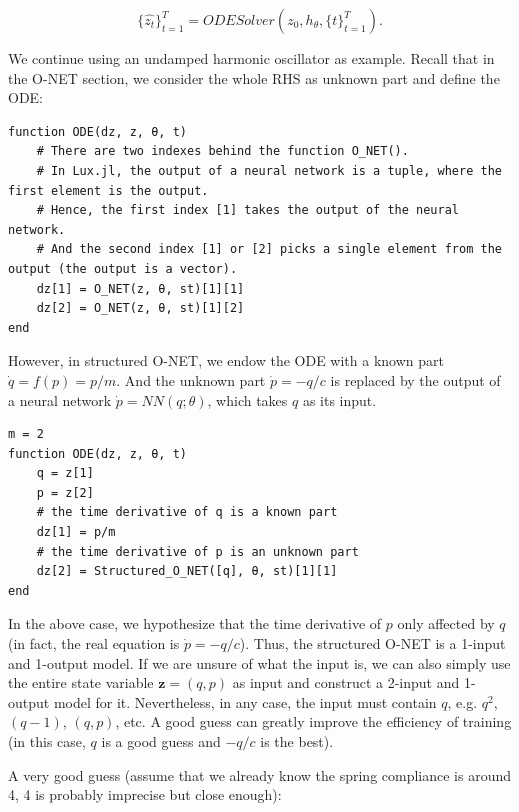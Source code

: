 \documentclass[
	parskip, 			   %
	twoside, 			   %
	DIV=14, 			   %
	BCOR=15.0mm, 		   %
	headsepline, 		   %
	open=right, 		   %
	captions=tableheading, %
	bibliography=totoc,    %
	numbers=noenddot       %
]{scrreprt}
\begin{document}
\begin{equation}
    \label{eq:structured_O-NET_ODESolver}
    \{ \hat{z_{t}} \}_{t=1}^{T} = ODESolver(z_{0}, h_{\theta}, \{ t \}_{t=1}^{T}).
\end{equation}

We continue using an undamped harmonic oscillator as example. Recall that in the O-NET section, we consider the whole RHS as unknown part and define the ODE:

\begin{verbatim}
function ODE(dz, z, θ, t)
    # There are two indexes behind the function O_NET().
    # In Lux.jl, the output of a neural network is a tuple, where the first element is the output.
    # Hence, the first index [1] takes the output of the neural network.
    # And the second index [1] or [2] picks a single element from the output (the output is a vector).
    dz[1] = O_NET(z, θ, st)[1][1]
    dz[2] = O_NET(z, θ, st)[1][2]
end
\end{verbatim}

However, in structured O-NET, we endow the ODE with a known part $\dot{q} = f(p) = p/m$. And the unknown part $\dot{p} = -q/c$ is replaced by the output of a neural network $\dot{p} = NN(q; \theta)$, which takes $q$ as its input.

\begin{verbatim}
m = 2
function ODE(dz, z, θ, t)
    q = z[1]
    p = z[2]
    # the time derivative of q is a known part
    dz[1] = p/m
    # the time derivative of p is an unknown part
    dz[2] = Structured_O_NET([q], θ, st)[1][1]
end
\end{verbatim}

In the above case, we hypothesize that the time derivative of $p$ only affected by $q$ (in fact, the real equation is $\dot{p} = -q/c$). Thus, the structured O-NET is a 1-input and 1-output model. If we are unsure of what the input is, we can also simply use the entire state variable $\mathbf{z} = (q, p)$ as input and construct a 2-input and 1-output model for it. Nevertheless, in any case, the input must contain $q$, e.g. $q^2$, $(q-1)$, $(q, p)$, etc. A good guess can greatly improve the efficiency of training (in this case, $q$ is a good guess and $-q/c$ is the best). 

A very good guess (assume that we already know the spring compliance is around 4, 4 is probably imprecise but close enough):
\end{document}
